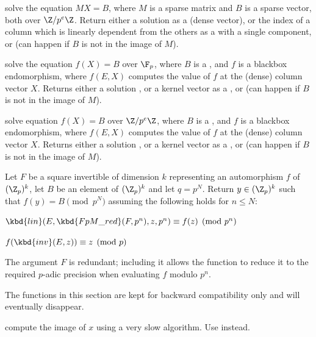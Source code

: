 solve the equation $MX = B$, where $M$ is a sparse matrix and $B$ is a sparse
vector, both over $\Z/p^e\Z$. Return either a solution as a  (dense
vector), or the index of a column which is linearly dependent from the
others as a  with a single component, or 
(can happen if $B$ is not in the image of $M$).

solve the equation $f(X) = B$ over $\F_p$, where $B$ is a , and $f$
is a blackbox endomorphism, where $f(E, X)$ computes the value of $f$ at the
(dense) column vector $X$. Returns either a solution , or a kernel
vector as a , or 
(can happen if $B$ is not in the image of $M$).

solve equation $f(X) = B$ over $\Z/p^e\Z$, where $B$ is a , and $f$ is a
blackbox endomorphism, where $f(E, X)$ computes the value of $f$ at the
(dense) column vector $X$. Returns either a solution , or a kernel
vector as a , or  (can happen if $B$ is not in the image
of $M$).

Let $F$ be a square invertible  of dimension $k$
representing an automorphism $f$ of $(\Z_p)^k$,
let $B$ be an element of $(\Z_p)^k$ and let $q = p^N$.  Return $y\in(\Z_p)^k$
such that $f(y)=B\pmod{p^N}$ assuming the following holds for $n\leq N$:

\item $\kbd{lin}(E, \kbd{FpM\_red}(F, p^n), z, p^n) \equiv f(z) \pmod{p^n}$

\item $f(\kbd{inv}(E, z)) \equiv z \pmod{p}$

The argument $F$ is redundant; including it allows the function
to reduce it to the required $p$-adic precision when evaluating $f$ modulo
$p^n$.


The functions in this section are kept for backward compatibility only
and will eventually disappear.

 compute the image of $x$ using a very slow
algorithm. Use  instead.

